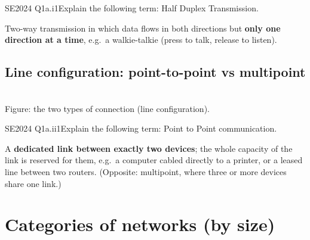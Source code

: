\documentclass[10pt]{article}
\newcommand{\figcap}[1]{{\scriptsize\color{midgrey}#1}}
\begin{document}
\begin{pastq}{SE2024 Q1a.i}{1}Explain the following term: Half Duplex Transmission.\end{pastq}
\begin{ans}
Two-way transmission in which data flows in both directions but \textbf{only one direction at a time}, e.g.\ a walkie-talkie (press to talk, release to listen).
\end{ans}

\subsection{Line configuration: point-to-point vs multipoint}
\begin{center}
\\
\figcap{Figure: the two types of connection (line configuration).}
\end{center}

\begin{pastq}{SE2024 Q1a.ii}{1}Explain the following term: Point to Point communication.\end{pastq}
\begin{ans}
A \textbf{dedicated link between exactly two devices}; the whole capacity of the link is reserved for them, e.g.\ a computer cabled directly to a printer, or a leased line between two routers. (Opposite: multipoint, where three or more devices share one link.)
\end{ans}

\section{Categories of networks (by size)}
\end{document}
